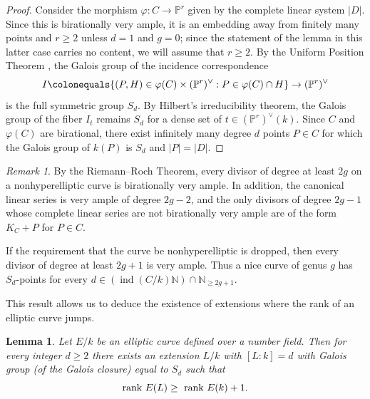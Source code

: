 \documentclass[a4paper,11pt]{amsart}
\theoremstyle{plain}
\newtheorem{lemma}[thm]{Lemma}
\theoremstyle{remark}
\newtheorem{remark}[thm]{Remark}
\newcommand{\nn}{\mathbb{N}}
\renewcommand{\P}{\mathbb{P}}
\newcommand{\pp}{\mathbb{P}}
\newcommand{\ind}{\operatorname{ind}}
\begin{document}
\begin{proof}
Consider the morphism \(\varphi \colon C \to \pp^r\) given by the complete linear system \(|D|\).  Since this is birationally very ample, it is an embedding away from finitely many points and \(r \geq 2\) unless \(d=1\) and \(g=0\); since the statement of the lemma in this latter case carries no content, we will assume that \(r \geq 2\).
By the Uniform Position Theorem \cite[Lemma, Page 111]{ACGH}, the Galois group of the incidence correspondence 
\[I \colonequals \{(P, H) \in \varphi(C) \times (\P^
{r})^\vee :  P\in \varphi(C) \cap H\} \to (\P^{r})^\vee\] 
is the full symmetric group \(S_d\).  By Hilbert's irreducibility theorem, the Galois group of the fiber \(I_t\) remains \(S_d\) for a dense set of \(t \in (\P^{r})^\vee(k)\).  Since \(C\) and \(\varphi(C)\) are birational, there exist infinitely many degree \(d\) points \(P \in C\) for which the Galois group of \(k(P)\) is \(S_d\) and \(|P| = |D|\).
\end{proof}

\begin{remark}\label{rem:asymptotic_Sd}
   By the Riemann--Roch Theorem, every divisor of degree at least \(2g\) on a nonhyperelliptic curve is birationally very ample.  In addition, the canonical linear series is very ample of degree \(2g-2\), and the only divisors of degree \(2g-1\) whose complete linear series are not birationally very ample are of the form \(K_C + P\) for \(P \in C\).
   
   If the requirement that the curve be nonhyperelliptic is dropped, then every divisor of degree at least \(2g + 1\) is very ample.  Thus a nice curve of genus \(g\) has \(S_d\)-points for every \(d \in \left(\ind(C/k)  \nn \right) \cap \nn_{\geq 2g+1}\).
\end{remark}



This result allows us to deduce the existence of extensions where the rank of an elliptic curve jumps. 


\begin{lemma}\label{lem:rankgoesup}
Let $E/k$ be an elliptic curve defined over a number field. 
Then for every integer \(d \geq 2\) there exists an extension $L/k$ with $[L:k] = d$ with Galois group (of the Galois closure) equal to \(S_d\) such that
\[\textup{rank }E(L) \geq \textup{ rank }E(k)+1.\]
\end{lemma}
\end{document}
